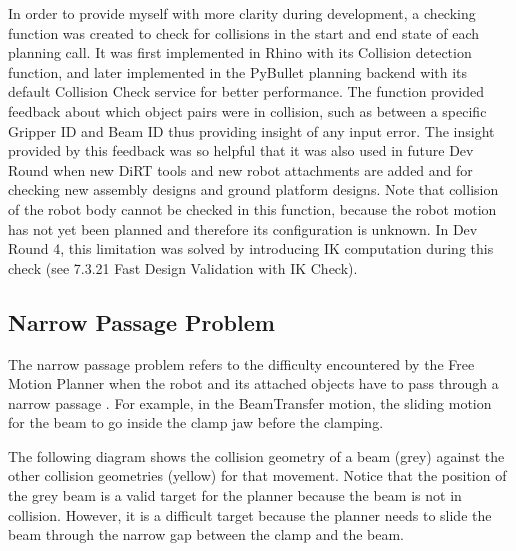 In order to provide myself with more clarity during development, a checking function was created to check for collisions in the start and end state of each planning call. It was first implemented in Rhino with its Collision detection function, and later implemented in the PyBullet planning backend \parencite{coumansPyBulletPythonModule2016, huangCompas_fab_pychoreo2023} with its default Collision Check service for better performance. The function provided feedback about which object pairs were in collision, such as between a specific Gripper ID and Beam ID thus providing insight of any input error.
The insight provided by this feedback was so helpful that it was also used in future Dev Round when new DiRT tools and new robot attachments are added and for checking new assembly designs and ground platform designs. 
Note that collision of the robot body cannot be checked in this function, because the robot motion has not yet been planned and therefore its configuration is unknown. In Dev Round 4, this limitation was solved by introducing IK computation during this check (see 7.3.21 Fast Design Validation with IK Check).

\subsection{Narrow Passage Problem}
The narrow passage problem refers to the difficulty encountered by the Free Motion Planner when the robot and its attached objects have to pass through a narrow passage \parencite{lavallePlanningAlgorithms2006}. For example, in the BeamTransfer motion, the sliding motion for the beam to go inside the clamp jaw before the clamping. 

The following diagram shows the collision geometry of a beam (grey) against the other collision geometries (yellow) for that movement. Notice that the position of the grey beam is a valid target for the planner because the beam is not in collision. However, it is a difficult target because the planner needs to slide the beam through the narrow gap between the clamp and the beam. 

